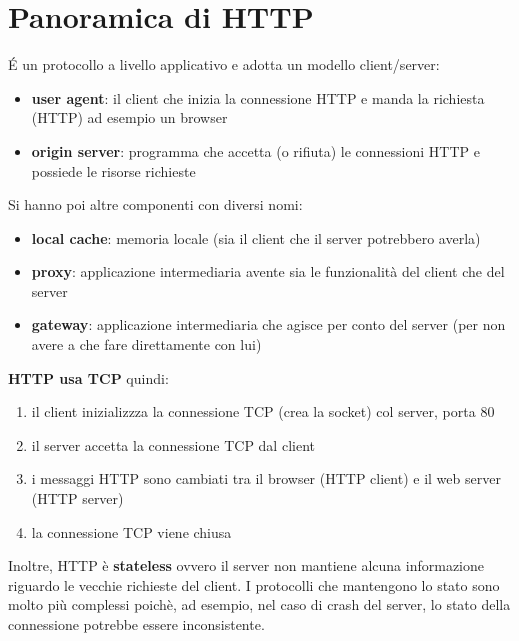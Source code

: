 \section{Panoramica di HTTP}
\'E un protocollo a livello applicativo e adotta un modello client/server:
\begin{itemize}
    \item \textbf{user agent}: il client che inizia la connessione HTTP e manda la richiesta (HTTP) ad esempio un browser
    \item \textbf{origin server}: programma che accetta (o rifiuta) le connessioni HTTP e possiede le risorse richieste
\end{itemize}
Si hanno poi altre componenti con diversi nomi:
\begin{itemize}
    \item \textbf{local cache}: memoria locale (sia il client che il server potrebbero averla)
    \item \textbf{proxy}: applicazione intermediaria avente sia le funzionalità del client che del server
    \item \textbf{gateway}: applicazione intermediaria che agisce per conto del server (per non avere a che fare direttamente con lui)
\end{itemize}
\hfill \break
\textbf{HTTP usa TCP} quindi:
\begin{enumerate}
    \item il client inizializzza la connessione TCP (crea la socket) col server, porta 80
    \item il server accetta la connessione TCP dal client
    \item i messaggi HTTP sono cambiati tra il browser (HTTP client) e il web server (HTTP server)
    \item la connessione TCP viene chiusa
\end{enumerate}
Inoltre, HTTP è \textbf{stateless} ovvero il server non mantiene alcuna informazione riguardo le vecchie richieste del client. I protocolli che mantengono lo stato sono molto più complessi poichè, ad esempio, nel caso di crash del server, lo stato della connessione potrebbe essere inconsistente.

